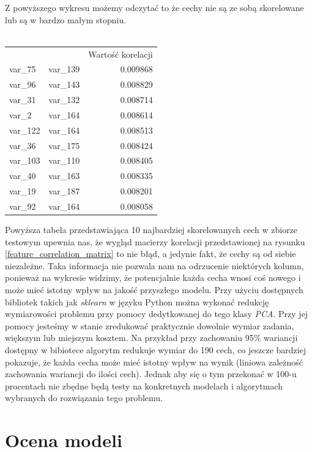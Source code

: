 ﻿\documentclass[12pt]{article}
\begin{document}
Z powyższego wykresu możemy odczytać to że cechy nie są ze sobą skorelowane lub są w bardzo małym stopniu. \\
\\
\begin{tabular}{llr}
   &   &        Wartość korelacji \\
var\_75 & var\_139 &  0.009868 \\
var\_96 & var\_143 &  0.008829 \\
var\_31 & var\_132 &  0.008714 \\
var\_2 & var\_164 &  0.008614 \\
var\_122 & var\_164 &  0.008513 \\
var\_36 & var\_175 &  0.008424 \\
var\_103 & var\_110 &  0.008405 \\
var\_40 & var\_163 &  0.008335 \\
var\_19 & var\_187 &  0.008201 \\
var\_92 & var\_164 &  0.008058 \\
\end{tabular}

Powyższa tabela przedstawiająca 10 najbardziej skorelowanych cech w zbiorze testowym upewnia nas, że wygląd macierzy korelacji przedstawionej na rysunku \ref{feature_correlation_matrix} to nie błąd, a jedynie fakt, że cechy są od siebie niezależne.
Taka informacja nie pozwala nam na odrzucenie niektórych kolumn, ponieważ na wykresie widzimy, że potencjalnie każda cecha wnosi coś nowego i może mieć istotny wpływ na jakość przyszłego modelu.
\newline
Przy użyciu dostępnych bibliotek takich jak \textit{sklearn} w języku Python można wykonać redukcję wymiarowości problemu przy pomocy dedytkowanej do tego klasy \textit{PCA}. Przy jej pomocy jesteśmy w stanie zredukować praktycznie dowolnie wymiar zadania, większym lub miejszym kosztem.
Na przykład przy zachowaniu 95\% wariancji dostępny w bibiotece algorytm redukuje wymiar do 190 cech, co jeszcze bardziej pokazuje, że każda cecha może mieć istotny wpływ na wynik (liniowa zależność zachowania wariancji do ilości cech). Jednak aby się o tym przekonać w 100-u procentach nie zbędne będą testy na konkretnych modelach i algorytmach wybranych do rozwiązania tego problemu.

\section{Ocena modeli}
\end{document}
